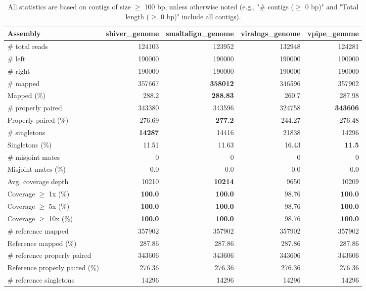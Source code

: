 \documentclass[12pt,a4paper]{article}
\begin{document}
\begin{table}[ht]
\begin{center}
\caption{All statistics are based on contigs of size $\geq$ 100 bp, unless otherwise noted (e.g., "\# contigs ($\geq$ 0 bp)" and "Total length ($\geq$ 0 bp)" include all contigs).}
\begin{tabular}{|l*{4}{|r}|}
\hline
Assembly & shiver\_genome & smaltalign\_genome & viralngs\_genome & vpipe\_genome \\ \hline
\# total reads & 124103 & 123952 & 132948 & 124281 \\ \hline
\# left & 190000 & 190000 & 190000 & 190000 \\ \hline
\# right & 190000 & 190000 & 190000 & 190000 \\ \hline
\# mapped & 357667 & {\bf 358012} & 346596 & 357902 \\ \hline
Mapped (\%) & 288.2 & {\bf 288.83} & 260.7 & 287.98 \\ \hline
\# properly paired & 343380 & 343596 & 324758 & {\bf 343606} \\ \hline
Properly paired (\%) & 276.69 & {\bf 277.2} & 244.27 & 276.48 \\ \hline
\# singletons & {\bf 14287} & 14416 & 21838 & 14296 \\ \hline
Singletons (\%) & 11.51 & 11.63 & 16.43 & {\bf 11.5} \\ \hline
\# misjoint mates & 0 & 0 & 0 & 0 \\ \hline
Misjoint mates (\%) & 0.0 & 0.0 & 0.0 & 0.0 \\ \hline
Avg. coverage depth & 10210 & {\bf 10214} & 9650 & 10209 \\ \hline
Coverage $\geq$ 1x (\%) & {\bf 100.0} & {\bf 100.0} & 98.76 & {\bf 100.0} \\ \hline
Coverage $\geq$ 5x (\%) & {\bf 100.0} & {\bf 100.0} & 98.76 & {\bf 100.0} \\ \hline
Coverage $\geq$ 10x (\%) & {\bf 100.0} & {\bf 100.0} & 98.76 & {\bf 100.0} \\ \hline
\# reference mapped & 357902 & 357902 & 357902 & 357902 \\ \hline
Reference mapped (\%) & 287.86 & 287.86 & 287.86 & 287.86 \\ \hline
\# reference properly paired & 343606 & 343606 & 343606 & 343606 \\ \hline
Reference properly paired (\%) & 276.36 & 276.36 & 276.36 & 276.36 \\ \hline
\# reference singletons & 14296 & 14296 & 14296 & 14296 \\ \hline

\end{tabular}
\end{center}
\end{table}
\end{document}
